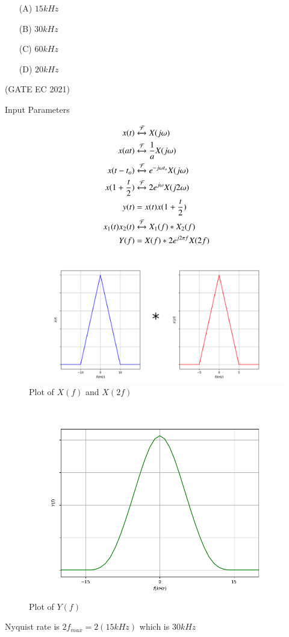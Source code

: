 \documentclass[journal,12pt,twocolumn]{IEEEtran}
\theoremstyle{remark}
\begin{document}
\begin{enumerate}
\item[(A)] $15kHz$
\item[(B)] $30kHz$
\item[(C)] $60kHz$
\item[(D)] $20kHz$
\end{enumerate}
\hfill{(GATE EC 2021)}\\
\solution
\begin{table}[h!]
\centering

\caption{Input Parameters}
\label{tab:gate2021ec4table}
\end{table}
\begin{align}
x(t) &\xleftrightarrow{\mathcal{F}} X(j\omega)\\
x(at) &\xleftrightarrow{\mathcal{F}} \frac{1}{a}X(j\omega)\\
x(t-t_o) &\xleftrightarrow{\mathcal{F}} e^{-j\omega t_o}X(j\omega)\\
x(1+\frac{t}{2}) &\xleftrightarrow{\mathcal{F}} 2e^{j\omega}X(j2\omega)\\
y(t) &= x(t)x(1+\frac{t}{2})\\
x_1(t)x_2(t) &\xleftrightarrow{\mathcal{F}} X_1(f) * X_2(f)\\
Y(f) &= X(f) * 2e^{j2\pi f}X(2f)
\end{align}
\begin{figure}[h!]
    \centering
    \includegraphics[width=\columnwidth]{figs/plot1.png}
    \caption{Plot of $X(f)$ and $X(2f)$}
    \label{fig:gate2021ec4fig1}
\end{figure}
\begin{figure}[h!]
    \centering
    \includegraphics[width=\columnwidth]{figs/plot2.png}
    \caption{Plot of $Y(f)$}
    \label{fig:gate2021ec4fig2}
\end{figure}
Nyquist rate is $2f_{max} = 2(15kHz)$ which is $30kHz$
\end{document}
